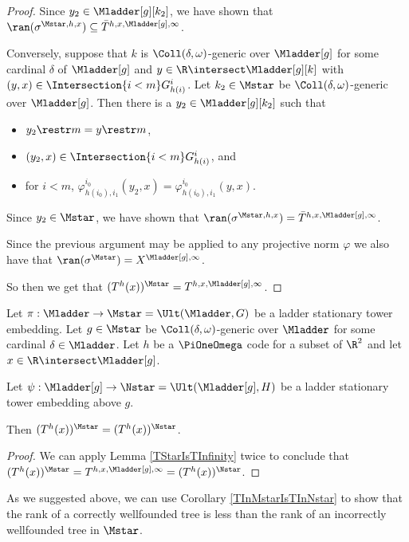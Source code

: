 \documentclass[oneside,12pt]{amsart}
\begin{document}
\begin{proof}
Since $y_2\in \Mladder[g][k_2]$,
we have shown that $\ran(\sigma^{\Mstar,h,x})\subseteq \bar{T}^{h,x,\Mladder[g],\infty}$.

Conversely, suppose that $k$ is $\Coll(\delta,\omega)$-generic over $\Mladder[g]$ for some cardinal $\delta$ of $\Mladder[g]$ and
$y\in\R\intersect \Mladder[g][k]$ with $(y,x)\in \Intersection{i<m} G^i_{h(i)}$. Let $k_2\in\Mstar$ be
$\Coll(\delta,\omega)$-generic over $\Mladder[g]$. Then there is a $y_2\in \Mladder[g][k_2]$ such that
\begin{itemize}
\item $y_2 \restr m = y \restr m$,
\item $(y_2,x)\in \Intersection{i<m} G^i_{h(i)}$, and
\item for $i<m$, $\varphi^{i_0}_{h(i_0),i_1}(y_2,x) = \varphi^{i_0}_{h(i_0),i_1}(y,x)$.
\end{itemize}


Since $y_2\in \Mstar$,
we have shown that $\ran(\sigma^{\Mstar,h,x}) = \bar{T}^{h,x,\Mladder[g],\infty}$.

Since the previous argument may be applied to any projective norm $\varphi$ we also have that
$\ran(\sigma^{\Mstar}) =X^{\Mladder[g],\infty}$.

So then we get that $(T^h(x))^{\Mstar} = T^{h,x,\Mladder[g],\infty}$.

\end{proof}

\begin{corollary}
\label{TInMstarIsTInNstar}
Let $\pi:\Mladder\to\Mstar=\Ult(\Mladder,G)$ be a ladder stationary tower embedding.
Let $g\in\Mstar$ be $\Coll(\delta,\omega)$-generic over $\Mladder$ for some cardinal $\delta\in\Mladder$.
Let $h$ be a $\PiOneOmega$ code for a subset
of $\R^2$ and let $x\in\R\intersect \Mladder[g]$.

Let $\psi:\Mladder[g]\to\Nstar=\Ult(\Mladder[g],H)$ be a ladder stationary tower embedding above $g$.

Then $(T^h(x))^{\Mstar} = (T^h(x))^{\Nstar}$.
\end{corollary}
\begin{proof}
We can apply Lemma \ref{TStarIsTInfinity} twice to conclude that $(T^h(x))^{\Mstar} = T^{h,x,\Mladder[g],\infty} = (T^h(x))^{\Nstar}$.
\end{proof}

As we suggested above, we can use Corollary \ref{TInMstarIsTInNstar} to show that the rank of a correctly wellfounded tree is less
than the rank of an incorrectly wellfounded tree in $\Mstar$.
\end{document}
